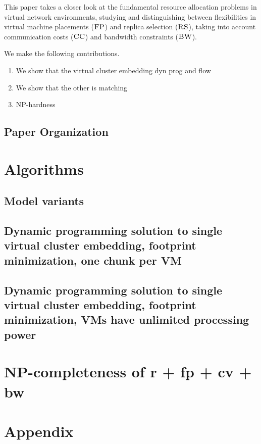 \documentclass[11pt,a4paper]{scrartcl}
\newcommand{\CC}{\textsc{CC}}
\newcommand{\FP}{\textsc{FP}}
\newcommand{\RS}{\textsc{RS}}
\newcommand{\BW}{\textsc{BW}}
\begin{document}
This paper takes a closer look at the fundamental resource allocation problems 
in virtual network environments, studying and distinguishing between flexibilities in virtual machine placements ($\FP$) and
replica selection ($\RS$), taking into account communication costs ($\CC$) and bandwidth constraints ($\BW$).   

We make the following contributions.
\begin{enumerate}
\item We show that the virtual cluster embedding dyn prog and flow
\item We show that the other is matching
\item NP-hardness
\end{enumerate}



\subsection{Paper Organization}


\section{Algorithms}

\subsection{Model variants}


\subsection{Dynamic programming solution to single virtual cluster
  embedding, footprint minimization, one chunk per VM}



\subsection{Dynamic programming solution to single virtual cluster
  embedding, footprint minimization, VMs have unlimited processing power}


\section{NP-completeness of r + fp + cv + bw}



\section{Appendix}



\end{document}
